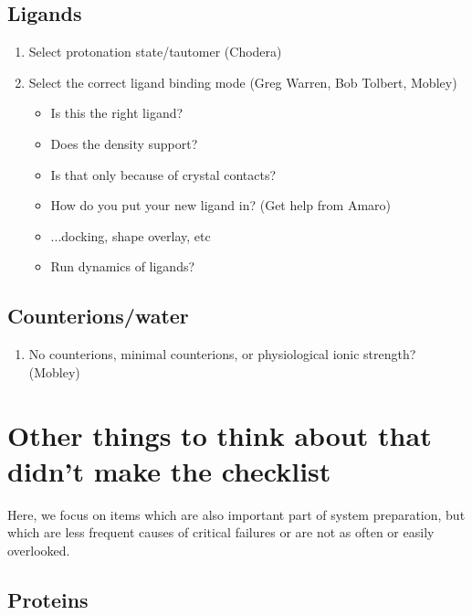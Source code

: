 \documentclass[9pt]{livecoms}
\begin{document}
{\begin{enumerate}
\end{enumerate}



\subsection{Ligands}

\begin{enumerate}
\item Select protonation state/tautomer (Chodera)
\item Select the correct ligand binding mode (Greg Warren, Bob Tolbert, Mobley) %
    \begin{itemize}
    \item Is this the right ligand?
    \item Does the density support?
    \item Is that only because of crystal contacts?
    \item How do you put your new ligand in? (Get help from Amaro)
    \item ...docking, shape overlay, etc
    \item Run dynamics of ligands?
    \end{itemize}
\end{enumerate}

\subsection{Counterions/water}

\begin{enumerate}
\item No counterions, minimal counterions, or physiological ionic strength? (Mobley)

\end{enumerate}

\section{Other things to think about that didn't make the checklist}

Here, we focus on items which are also important part of system preparation, but which are less frequent causes of critical failures or are not as often or easily overlooked.

\subsection{Proteins}

}
\end{document}
